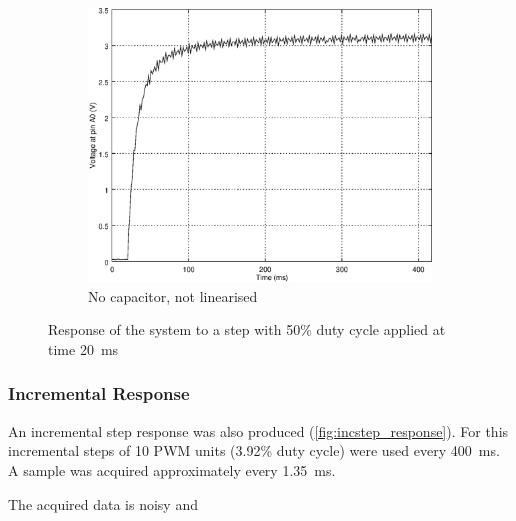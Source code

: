 \begin{figure}[h]
    \begin{subfigure}[t]{0.49\textwidth}
	\centering
	\includegraphics[width=.95\textwidth]{img/step_response_no_capacitor}
	\caption{No capacitor, not linearised}
	\label{fig:step_response_no_capacitor}
    \end{subfigure}
    \caption{Response of the system to a step with 50\% duty cycle applied at time \SI{20}{\milli\second}}
\end{figure}

\subsubsection{Incremental Response}
\label{sub:IncrementalResponse}

An incremental step response was also produced (\autoref{fig:incstep_response}). For this incremental steps of 10 PWM units (3.92\% duty cycle) were used every \SI{400}{\milli\second}. A sample was acquired approximately every \SI{1.35}{\milli\second}.

The acquired data is noisy and

